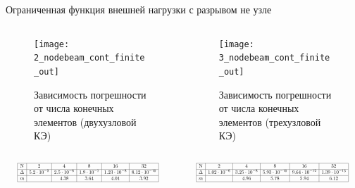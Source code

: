 \documentclass[7pt]{beamer}
\numberwithin{equation}{section}
\newcommand*{\Scale}[2][4]{\scalebox{#1}{$#2$}}
\begin{document}
	\begin{frame}{}
		Ограниченная функция внешней нагрузки с разрывом не узле
			\begin{columns}
				\begin{column}{0.57\textwidth}
					\begin{figure}[H]
						\centering
						\texttt{[image: 2\_nodebeam\_cont\_finite\_out]}
						\caption{Зависимость погрешности от числа конечных элементов (двухузловой КЭ)}
						\label{fig:2_nodebeam_cont_finite_out}
					\end{figure}
				\end{column}
				\begin{column}{0.57\textwidth}
					\begin{figure}[H]
						\centering
						\texttt{[image: 3\_nodebeam\_cont\_finite\_out]}
						\caption{Зависимость погрешности от числа конечных элементов (трехузловой КЭ)}
						\label{fig:3_nodebeam_cont_finite_out}
					\end{figure}
				\end{column}
			\end{columns}
			\begin{columns}
				\begin{column}{0.5\textwidth}
					\[
						\Scale[0.5] {
								\begin{array}{|c|c|c|c|c|c|}
									\hline
									\text{N} & 2 & 4 & 8 & 16 & 32 \\ \hline
									\Delta  & 5.2 \cdot 10^{-5} & 2.5 \cdot 10^{-6} & 1.9 \cdot 10^{-7} & 1.23 \cdot 10^{-8} & 8.12 \cdot 10^{-10} \\ \hline
									m  &  & 4.38 & 3.64 & 4.01 & 3.92 \\ 
									\hline
										\end{array}
						}
					\]
				\end{column}
				\begin{column}{0.5\textwidth}
					\[
							\Scale[0.5] {
					\begin{array}{|c|c|c|c|c|c|}
					\hline
					\text{N} & 2 & 4 & 8 & 16 & 32\\ \hline
				\Delta  & 1.02 \cdot 10^{-6} & 3.25 \cdot 10^{-8} & 5.93 \cdot 10^{-10} & 9.64 \cdot 10^{-12} & 1.39 \cdot 10^{-13}\\ \hline
				m  &  &  4.96 & 5.78 & 5.94 & 6.12 \\ 
					\hline
					\end{array}
						}
						\]
				\end{column}
			\end{columns}
		\end{frame}
\end{document}
